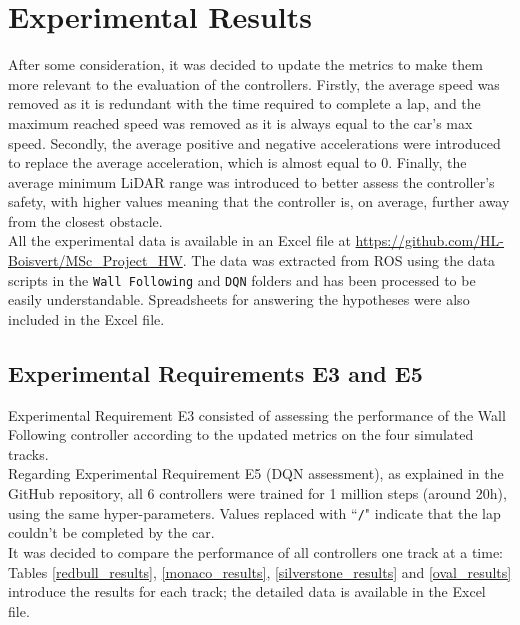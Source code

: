 
\chapter{Experimental Results} %

\label{Chapter7} %




After some consideration, it was decided to update the metrics to make them more relevant to the evaluation of the controllers. Firstly, the average speed was removed as it is redundant with the time required to complete a lap, and the maximum reached speed was removed as it is always equal to the car's max speed. Secondly, the average positive and negative accelerations were introduced to replace the average acceleration, which is almost equal to 0. Finally, the average minimum LiDAR range was introduced to better assess the controller's safety, with higher values meaning that the controller is, on average, further away from the closest obstacle. \\
All the experimental data is available in an Excel file at \url{https://github.com/HL-Boisvert/MSc_Project_HW}. The data was extracted from ROS using the data scripts in the \verb|Wall Following| and \verb|DQN| folders and has been processed to be easily understandable. Spreadsheets for answering the hypotheses were also included in the Excel file.

\section{Experimental Requirements E3 and E5}
\label{exp_assessment}
Experimental Requirement E3 consisted of assessing the performance of the Wall Following controller according to the updated metrics on the four simulated tracks. \\
Regarding Experimental Requirement E5 (DQN assessment), as explained in the GitHub repository, all 6 controllers were trained for 1 million steps (around 20h), using the same hyper-parameters. Values replaced with ``\verb|/|" indicate that the lap couldn't be completed by the car. \\
It was decided to compare the performance of all controllers one track at a time:
Tables \ref{redbull_results}, \ref{monaco_results}, \ref{silverstone_results} and \ref{oval_results} introduce the results for each track; the detailed data is available in the Excel file.\\

